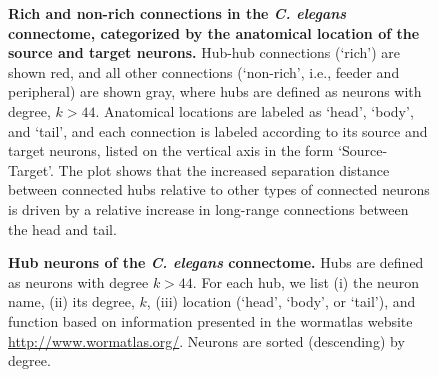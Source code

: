\begin{figure}[h!]
 \caption{{\bf Rich and non-rich connections in the \emph{C. elegans} connectome, categorized by the  anatomical location of the source and target neurons.}
   Hub-hub connections (`rich') are shown red, and all other connections (`non-rich', i.e., feeder and peripheral) are shown gray, where hubs are defined as neurons with degree, $k > 44$.
Anatomical locations are labeled as `head', `body', and `tail', and each connection is labeled according to its source and target neurons, listed on the vertical axis in the form `Source-Target'.
The plot shows that the increased separation distance between connected hubs relative to other types of connected neurons is driven by a relative increase in long-range connections between the head and tail.}
\label{fig:Ch2S6_Fig}
\end{figure}

\begin{figure}[h!]
   \caption{{\bf Hub neurons of the \textit{C. elegans} connectome.} Hubs are defined as neurons with degree $k > 44$. For each hub, we list (i) the neuron name, (ii) its degree, $k$, (iii) location (`head', `body', or `tail'), and function based on information presented in the wormatlas website \url{http://www.wormatlas.org/}.
Neurons are sorted (descending) by degree.}
\label{tab:HubList}
\end{figure}

